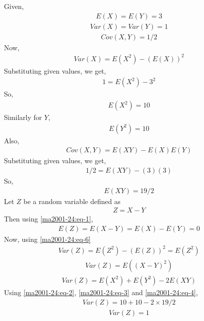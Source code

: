 
Given,
\begin{align} \label{ma2001-24:eq-1}
    E(X)=E(Y)=3
\end{align}
\begin{align}
    Var(X)=Var(Y)=1
\end{align}
\begin{align}
    Cov(X,Y)=1/2
\end{align}
Now,
\begin{align}
    Var(X)=E(X^2)-(E(X))^2
\end{align}
Substituting given values, we get,
\begin{align}
    1=E(X^2)-3^2
\end{align}
So,
\begin{align} \label{ma2001-24:eq-2}
    E(X^2)=10
\end{align}
Similarly for $Y$,
\begin{align} \label{ma2001-24:eq-3}
    E(Y^2)=10
\end{align}
Also,
\begin{align}
    Cov(X,Y)=E(XY)-E(X)E(Y)
\end{align}
Substituting given values, we get,
\begin{align}
    1/2=E(XY)-(3)(3)
\end{align}
So,
\begin{align} \label{ma2001-24:eq-4}
    E(XY)=19/2
\end{align}
Let $Z$ be a random variable defined as
\begin{align} \label{ma2001-24:eq-5}
    Z=X-Y
\end{align}
Then using \eqref{ma2001-24:eq-1},
\begin{align} \label{ma2001-24:eq-6}
    E(Z)=E(X-Y)=E(X)-E(Y)=0
\end{align}
Now, using \eqref{ma2001-24:eq-6}
\begin{align}
    Var(Z)=E(Z^2)-(E(Z))^2=E(Z^2)
\end{align}
\begin{align}
    Var(Z)=E((X-Y)^2)
\end{align}
\begin{align}
    Var(Z)=E(X^2)+E(Y^2)-2E(XY)
\end{align}
Using \eqref{ma2001-24:eq-2}, \eqref{ma2001-24:eq-3} and \eqref{ma2001-24:eq-4},
\begin{align}
    Var(Z)=10+10-2 \times 19/2
\end{align}
\begin{align} \label{ma2001-24:eq-7}
    Var(Z)=1
\end{align}
